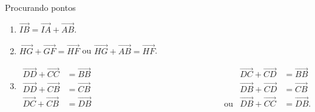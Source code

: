\begin{answer}{Procurando pontos}
{
\begin{enumerate}
\item {} 
\(\overrightarrow{IB} = \overrightarrow{IA} + \overrightarrow{AB}\).

\item {} 
\(\overrightarrow{HG} + \overrightarrow{GF} = \overrightarrow{HF}\) ou \(\overrightarrow{HG} + \overrightarrow{AB} = \overrightarrow{HF}\).

\item {} 
\begin{align*}
\overrightarrow{DD} + \overrightarrow{CC} &= \overrightarrow{BB} &
\overrightarrow{DC} + \overrightarrow{CD} &= \overrightarrow{BB} \\       
\overrightarrow{DD} + \overrightarrow{CB} &= \overrightarrow{CB} & 
\overrightarrow{DB} + \overrightarrow{CD} &= \overrightarrow{CB} \\       
\overrightarrow{DC} + \overrightarrow{CB} &= \overrightarrow{DB}\text{ { }{ }{ }{ }{ }{ }{ }{ }{ }{ }{ }{ }{ }{ }{ }{ }{ }{ }{ }{ }{ }{ }{ ou}} & 
\overrightarrow{DB} + \overrightarrow{CC} &= \overrightarrow{DB}.
\end{align*}



\end{enumerate}}
\end{answer}
